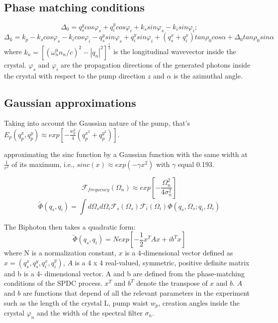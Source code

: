 \subsection{Phase matching conditions}
\begin{equation}
\Delta_0 = q^y_s cos \varphi_s + q^y_i cos \varphi_i + k_s sin \varphi_s - k_i sin \varphi_i ;
\end{equation}
\begin{equation}
\Delta_k = k_p - k_s cos \varphi_s - k_i cos \varphi_i - q^y_s sin \varphi_s + q^y_i sin \varphi_i 
+ (q^x_s + q^x_i ) tan \rho_0 cos \alpha + \Delta_0 tan \rho_0 sin \alpha 
\end{equation}
where $k_n=[(\omega^0_n n_n / c )^2 - |q_n|^2]^{\frac{1}{2}}$ is the longitudinal wavevector inside the crystal. $\varphi_s$ and $\varphi_i$ are the propagation directions of the generated photons inside the crystal with respect to the pump direction $z$ and $\alpha$ is the azimuthal angle.

\subsection{Gaussian approximations}

Taking into account the Gaussian nature of the pump, that's $E_p(q^x_p , q^y_p ) \approx exp \left[ -\frac{w_p^2}{4}(q^{x^2}_p + q^{y^2}_p )\right]$.

approximating the sinc function by a Gaussian function with the same width at $\frac{1}{e^2}$ of its maximum, i.e., $sinc(x)\approx exp(- \gamma x^2)$  with $\gamma$ equal 0.193. 

\begin{equation}
\mathcal{F}_{frequency}(\Omega_n) \approx exp \left[-\frac{ \Omega^2_n}{4 \sigma^2_n} \right] 
\end{equation}
\begin{equation}
\tilde{\Phi}(q_s,q_i)=\int d\Omega_s d\Omega_i \mathcal{F}_s (\Omega_s) \mathcal{F}_i (\Omega_i) \Phi(q_s,\Omega_s;q_i,\Omega_i)
\end{equation}

The Biphoton then takes a quadratic form:
\begin{equation}\label{eq:quadratic}
\tilde{\Phi}(q_s,q_i)=N exp\left[ -\frac{1}{2}x^T A x + i b^T x \right]
\end{equation}
where N is a normalization constant, $x$ is a 4-dimensional vector defined as $x = (q^x_s, q^y_s ,q^x_i,q^y_i )$, $A$ is a 4 x 4 real-valued, symmetric, positive definite matrix and b is a 4- dimensional vector. A and b are defined from the phase-matching conditions of the SPDC process. $x^T$ and $b^T$ denote the transpose of $x$ and $b$. $A$ and $b$ are functions that depend of all the relevant parameters in the experiment such as the length of the crystal L, pump waist $w_p$, creation angles inside the crystal $\varphi_n$ and the width of the spectral filter $\sigma_n$.

